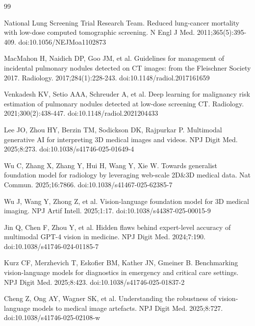 \documentclass[11pt]{article}
\begin{document}
\begin{thebibliography}{99}

National Lung Screening Trial Research Team. Reduced lung-cancer mortality with low-dose computed tomographic screening. N Engl J Med. 2011;365(5):395-409. doi:10.1056/NEJMoa1102873

MacMahon H, Naidich DP, Goo JM, et al. Guidelines for management of incidental pulmonary nodules detected on CT images: from the Fleischner Society 2017. Radiology. 2017;284(1):228-243. doi:10.1148/radiol.2017161659

Venkadesh KV, Setio AAA, Schreuder A, et al. Deep learning for malignancy risk estimation of pulmonary nodules detected at low-dose screening CT. Radiology. 2021;300(2):438-447. doi:10.1148/radiol.2021204433

Lee JO, Zhou HY, Berzin TM, Sodickson DK, Rajpurkar P. Multimodal generative AI for interpreting 3D medical images and videos. NPJ Digit Med. 2025;8:273. doi:10.1038/s41746-025-01649-4

Wu C, Zhang X, Zhang Y, Hui H, Wang Y, Xie W. Towards generalist foundation model for radiology by leveraging web-scale 2D\&3D medical data. Nat Commun. 2025;16:7866. doi:10.1038/s41467-025-62385-7

Wu J, Wang Y, Zhong Z, et al. Vision-language foundation model for 3D medical imaging. NPJ Artif Intell. 2025;1:17. doi:10.1038/s44387-025-00015-9

Jin Q, Chen F, Zhou Y, et al. Hidden flaws behind expert-level accuracy of multimodal GPT-4 vision in medicine. NPJ Digit Med. 2024;7:190. doi:10.1038/s41746-024-01185-7

Kurz CF, Merzhevich T, Eskofier BM, Kather JN, Gmeiner B. Benchmarking vision-language models for diagnostics in emergency and critical care settings. NPJ Digit Med. 2025;8:423. doi:10.1038/s41746-025-01837-2

Cheng Z, Ong AY, Wagner SK, et al. Understanding the robustness of vision-language models to medical image artefacts. NPJ Digit Med. 2025;8:727. doi:10.1038/s41746-025-02108-w


\end{thebibliography}
\end{document}

